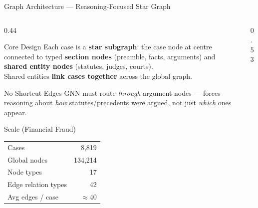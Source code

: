 \documentclass[aspectratio=169, 9pt]{beamer}
\begin{document}
\begin{frame}{Graph Architecture — Reasoning-Focused Star Graph}
  \begin{columns}[T]
    \begin{column}{0.44\textwidth}
      \begin{block}{Core Design}
        \small Each case is a \textbf{star subgraph}: the case node at centre connected to typed \textbf{section nodes} (preamble, facts, arguments) and \textbf{shared entity nodes} (statutes, judges, courts).\\[5pt]
        Shared entities \textbf{link cases together} across the global graph.
      \end{block}
      \vspace{5pt}
      \begin{alertblock}{No Shortcut Edges}
        \small GNN must route \emph{through} argument nodes — forces reasoning about \emph{how} statutes/precedents were argued, not just \emph{which} ones appear.
      \end{alertblock}
      \vspace{5pt}
      \begin{block}{Scale (Financial Fraud)}
        \scriptsize\renewcommand{\arraystretch}{1.1}
        \begin{tabular}{lr}
          Cases              & 8,819\\
          Global nodes       & 134,214\\
          Node types         & 17\\
          Edge relation types & 42\\
          Avg edges / case   & $\approx$40\\
        \end{tabular}
      \end{block}
    \end{column}
    \begin{column}{0.53\textwidth}
      \centering
\end{column}
\end{columns}
\end{frame}
\end{document}
